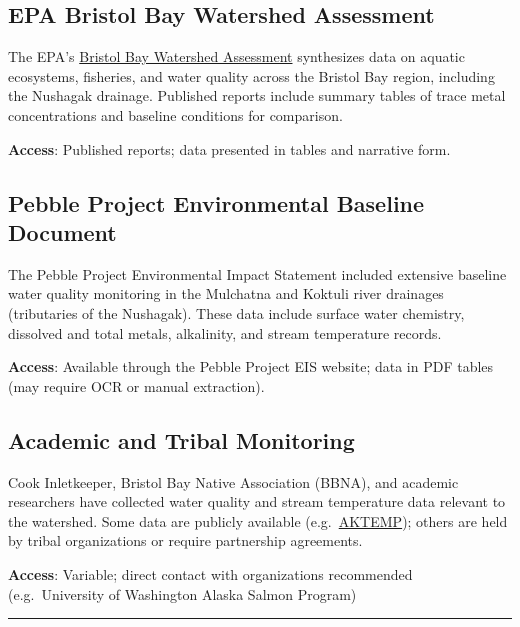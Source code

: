 \documentclass[
  letterpaper,
]{scrbook}
\begin{document}
\subsection{EPA Bristol Bay Watershed
Assessment}\label{epa-bristol-bay-watershed-assessment}

The EPA's \href{https://www.epa.gov/bristolbay}{Bristol Bay Watershed
Assessment} synthesizes data on aquatic ecosystems, fisheries, and water
quality across the Bristol Bay region, including the Nushagak drainage.
Published reports include summary tables of trace metal concentrations
and baseline conditions for comparison.

\textbf{Access}: Published reports; data presented in tables and
narrative form.

\subsection{Pebble Project Environmental Baseline
Document}\label{pebble-project-environmental-baseline-document}

The Pebble Project Environmental Impact Statement included extensive
baseline water quality monitoring in the Mulchatna and Koktuli river
drainages (tributaries of the Nushagak). These data include surface
water chemistry, dissolved and total metals, alkalinity, and stream
temperature records.

\textbf{Access}: Available through the Pebble Project EIS website; data
in PDF tables (may require OCR or manual extraction).

\subsection{Academic and Tribal
Monitoring}\label{academic-and-tribal-monitoring}

Cook Inletkeeper, Bristol Bay Native Association (BBNA), and academic
researchers have collected water quality and stream temperature data
relevant to the watershed. Some data are publicly available
(e.g.~\href{https://aktemp.uaa.alaska.edu/\#/}{AKTEMP}); others are held
by tribal organizations or require partnership agreements.

\textbf{Access}: Variable; direct contact with organizations recommended
(e.g.~University of Washington Alaska Salmon Program)

\begin{center}\rule{0.5\linewidth}{0.5pt}\end{center}
\end{document}
